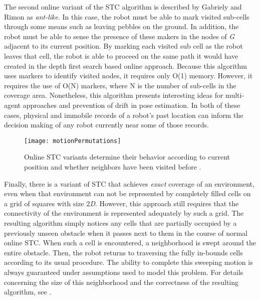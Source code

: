The second online variant of the STC algorithm is described by Gabriely and Rimon as \textit{ant-like}. In this case, the robot must be able to mark visited sub-cells through some means such as leaving pebbles on the ground. In addition, the robot must be able to sense the presence of these makers in the nodes of \textit{G} adjacent to its current position. By marking each visited sub cell as the robot leaves that cell, the robot is able to proceed on the same path it would have created in the depth first search based online approach. Because this algorithm uses markers to identify visited nodes, it requires only O(1) memory. However, it requires the use of O(N) markers, where N is the number of sub-cells in the coverage area. Nonetheless, this algorithm presents interesting ideas for multi-agent approaches and prevention of drift in pose estimation. In both of these cases, physical and immobile records of a robot's past location can inform the decision making of any robot currently near some of those records.

\begin{figure}[H]
\texttt{[image: motionPermutations]}
\caption[Neighbor Visiting Behavior for Online STC]{Online STC variants determine their behavior according to current position and whether neighbors have been visited before \cite{STC}.}
\end{figure}

Finally, there is a variant of STC that achieves \textit{exact} coverage of an environment, even when that environment can not be represented by completely filled cells on a grid of squares with size 2\textit{D}. However, this approach still requires that the connectivity of the environment is represented adequately by such a grid. The resulting algorithm simply notices any cells that are partially occupied by a previously unseen obstacle when it passes next to them in the course of normal online STC. When such a cell is encountered, a neighborhood is swept around the entire obstacle. Then, the robot returns to traversing the fully in-bounds cells according to its usual procedure. The ability to complete this sweeping motion is always guaranteed under assumptions used to model this problem. For details concerning the size of this neighborhood and the correctness of the resulting algorithm, see \cite{STC}.

